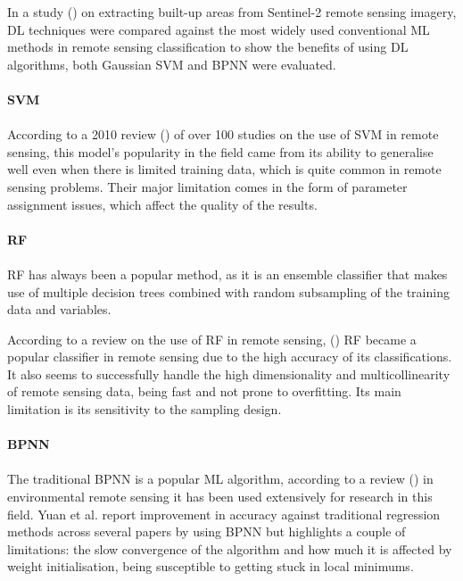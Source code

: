 In a study (\cite{isprs-archives-XLII-3-79-2018}) on extracting built-up areas from Sentinel-2 remote sensing imagery, \gls{DL} techniques were compared against the most widely used conventional \gls{ML} methods in remote sensing classification to show the benefits of using \gls{DL} algorithms, both Gaussian \gls{SVM} and \gls{BPNN} were evaluated.

\paragraph{\gls{SVM}}
\paragraph{}
According to a 2010 review (\cite{MOUNTRAKIS2011247}) of over 100 studies on the use of \gls{SVM} in remote sensing, this model's popularity in the field came from its ability to generalise well even when there is limited training data, which is quite common in remote sensing problems. Their major limitation comes in the form of parameter assignment issues, which affect the quality of the results.

\paragraph{\gls{RF}}
\paragraph{}
\gls{RF} has always been a popular method, as it is an ensemble classifier that makes use of multiple decision trees combined with random subsampling of the training data and variables. 

According to a review on the use of \gls{RF} in remote sensing, (\cite{BELGIU201624}) \gls{RF} became a popular classifier in remote sensing due to the high accuracy of its classifications. It also seems to successfully handle the high dimensionality and multicollinearity of remote sensing data, being fast and not prone to overfitting. Its main limitation is its sensitivity to the sampling design.

\paragraph{\gls{BPNN}}
\paragraph{}
The traditional \gls{BPNN} is a popular \gls{ML} algorithm, according to a review (\cite{YUAN2020111716}) in environmental remote sensing it has been used extensively for research in this field. Yuan et al. report improvement in accuracy against traditional regression methods across several papers by using \gls{BPNN} but highlights a couple of limitations: the slow convergence of the algorithm and how much it is affected by weight initialisation, being susceptible to getting stuck in local minimums. 

